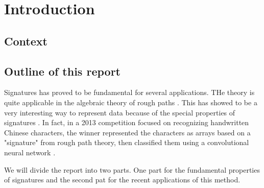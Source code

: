 \section{Introduction}\label{sec:introduction}

\subsection{Context}%
\label{sub:context}




\subsection{Outline of this report}%
\label{sub:outline_of_this_report}

Signatures has proved to be fundamental for several applications.
THe theory is quite applicable in the algebraic theory of rough paths \cite{geng2021introduction}. This has showed to be a very interesting way to represent data because of the special properties of signatures \cite{chevyrev2016primer}. In fact, in a 2013 competition focused on recognizing handwritten Chinese characters, the winner represented the characters as arrays based on a "signature" from rough path theory, then classified them using a convolutional neural network \cite{yin2013icdar}.



We will divide the report into two parts. One part for the fundamental properties of signatures and the second pat for the recent applications of this method.




